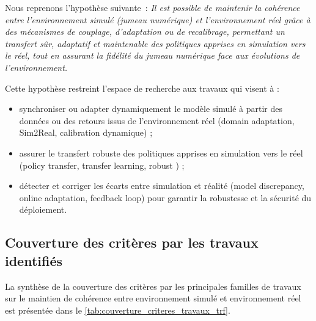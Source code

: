 Nous reprenons l'hypothèse suivante~: \textit{Il est possible de maintenir la cohérence entre l'environnement simulé (jumeau numérique) et l'environnement réel grâce à des mécanismes de couplage, d'adaptation ou de recalibrage, permettant un transfert sûr, adaptatif et maintenable des politiques apprises en simulation vers le réel, tout en assurant la fidélité du jumeau numérique face aux évolutions de l'environnement.}

Cette hypothèse restreint l'espace de recherche aux travaux qui visent à :
\begin{itemize}
  \item synchroniser ou adapter dynamiquement le modèle simulé à partir des données ou des retours issus de l'environnement réel (domain adaptation, Sim2Real, calibration dynamique) ;
  \item assurer le transfert robuste des politiques apprises en simulation vers le réel (policy transfer, transfer learning, robust ) ;
  \item détecter et corriger les écarts entre simulation et réalité (model discrepancy, online adaptation, feedback loop) pour garantir la robustesse et la sécurité du déploiement.
\end{itemize}



\subsection*{Couverture des critères par les travaux identifiés}

La synthèse de la couverture des critères par les principales familles de travaux sur le maintien de cohérence entre environnement simulé et environnement réel est présentée dans le \autoref{tab:couverture_criteres_travaux_trf}.

